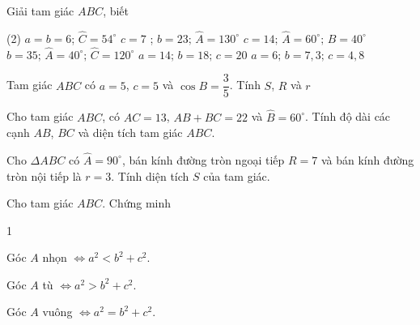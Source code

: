 \begin{bt}
	Giải tam giác $ABC$, biết
	\begin{tasks}(2)
		\task $a=b=6$; $\widehat{C}=54^{\circ}$
		\task $c=7$ ; $b=23\text{; }\widehat{A}=130^{\circ}$ 
		\task $c=14\text{; }\widehat{A}=60^{\circ}\text{; }\widehat{B}=40^{\circ}$
		\task $b=35\text{; }\widehat{A}=40^{\circ}\text{; }\widehat{C}=120^{\circ}$ 
		\task $a=14\text{; }b=18\text{; }c=20$ 
		\task $a=6\text{; }b=7,3\text{; }c=4,8$
	\end{tasks}
\end{bt}

\begin{bt}
	Tam giác $ABC$ có $a= 5$, $c= 5$ và $\cos B=\dfrac{3}{5}$. Tính $S$, $R$ và $r$
\end{bt}

\begin{bt}
	Cho tam giác $ABC$, có $AC= 13$, $AB+BC= 22$ và $\widehat{B}=60^{\circ}$. Tính độ dài các cạnh $AB$, $BC$ và diện tích tam giác $ABC$.
\end{bt}

\begin{bt}
	Cho $\Delta ABC$ có $\widehat{A}=90^\circ$, bán kính đường tròn ngoại tiếp $R=7$ và bán kính đường tròn nội tiếp là $r=3$. Tính diện tích $S$ của tam giác.
\end{bt}

\begin{bt}%
	Cho tam giác $ABC$. Chứng minh
	\begin{enumEX}{1}
		\item Góc $A$ nhọn $ \Leftrightarrow a^2<b^2+c^2$.
		\item Góc $A$ tù $ \Leftrightarrow a^2>b^2+c^2$.
		\item Góc $A$ vuông $ \Leftrightarrow a^2=b^2+c^2$.
	\end{enumEX}
\end{bt}

